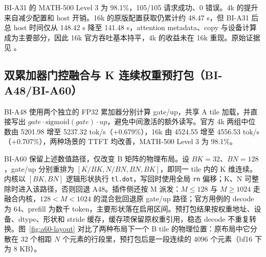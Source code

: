\documentclass[11pt,a4paper]{ctexart}
\begin{document}
BI-A31 的 MATH-500 Level 3 为 98.1\%，105/105 请求成功、0 错误。4k 的提升来自减少配置和 host 开销。16k 的原版配置获取仍累计约 48.47 s，但 BI-A31 后总 host 时间仅从 148.42 s 降至 141.48 s，attention metadata、copy 与设备计算成为主要部分，因此 16k 官方吞吐基本持平，4k 的收益未在 16k 重现。原始证据见 。

\subsection{双累加器门控融合与 K 连续权重预打包（BI-A48/BI-A60）}\label{sec:bi-a60}
BI-A48 使用两个独立的 FP32 累加器分别计算 gate/up，共享 A tile 加载，并直接写出 \(gate\cdot\mathrm{sigmoid}(gate)\cdot up\)，避免中间激活的额外读写。官方 4k 两组中位数由 5201.98 增至 5237.32 tok/s（+0.679\%），16k 由 4524.55 增至 4556.53 tok/s（+0.707\%），两种场景的 TTFT 均改善，MATH-500 Level 3 为 98.1\%。

BI-A60 保留上述数值路径，仅改变 B 矩阵的物理布局。设 \(BK=32\)、\(BN=128\)，gate/up 分别重排为 \([K/BK,N/BN,BN,BK]\)，即同一 tile 内的 K 维连续。内核以 \([BK,BN]\) 逻辑形状执行 \texttt{tl.dot}，写回时使用全局 \texttt{rn} 偏移；K、N 可整除时进入该路径，否则回退 A48。插件侧还按 M 派发：$M\le128$ 与 $M\ge1024$ 走融合内核，$128<M<1024$ 的混合批回退原 gate/up 路径；官方用例的 decode 为 64、prefill 为数千 token，主要形状落在启用区间。预打包结果按权重地址、设备、dtype、形状和 stride 缓存，缓存项保留原权重引用，稳态 decode 不重复转换。图~\ref{fig:a60-layout} 对比了两种布局下一个 B tile 的物理位置：原布局中它分散在 32 个相距 $N$ 个元素的行段里，预打包后是一段连续的 4096 个元素（bf16 下为 8 KB）。
\end{document}
